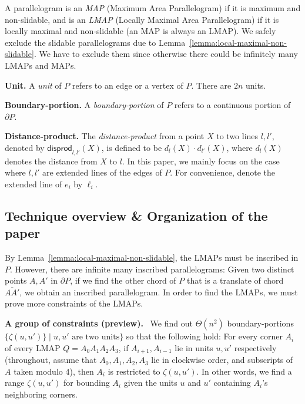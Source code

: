 \documentclass{ws-ijcga}
\begin{document}
\begin{definition}\label{def:LMAP}
A parallelogram is an \emph{MAP} (Maximum Area Parallelogram) if it is maximum and non-slidable,
and is an \emph{LMAP} (Locally Maximal Area Parallelogram) if it is locally maximal and non-slidable
(an MAP is always an LMAP).
We safely exclude the slidable parallelograms due to Lemma~\ref{lemma:local-maximal-non-slidable}.
We have to exclude them since otherwise there could be infinitely many LMAPs and MAPs.
\end{definition}

\noindent\textbf{Unit.} A \emph{unit} of $P$ refers to an edge or a vertex of $P$. There are $2n$ units.\smallskip

\noindent\textbf{Boundary-portion.} A \emph{boundary-portion} of $P$ refers to a continuous portion of $\partial P$.\smallskip

\newcommand{\dist}{\mathsf{disprod}}
\newcommand{\el}{\ell}        %
\noindent\textbf{Distance-product.} The \emph{distance-product} from a point $X$ to two lines $l,l'$,
  denoted by $\dist_{l,l'}(X)$, is defined to be $d_l(X)\cdot d_{l'}(X)$, where $d_l(X)$ denotes the distance from $X$ to $l$.
In this paper, we mainly focus on the case where $l,l'$ are extended lines of the edges of $P$.
For convenience, denote the extended line of $e_i$ by $\el_i$.

\subsection{Technique overview \& Organization of the paper}\label{subsect:techover}

By Lemma~\ref{lemma:local-maximal-non-slidable}, the LMAPs must be inscribed in $P$.
However, there are infinite many inscribed parallelograms:
  Given two distinct points $A,A'$ in $\partial P$, if we find the other chord of $P$ that is a translate of chord $\overline{AA'}$, we obtain an inscribed parallelogram. In order to find the LMAPs, we must prove more constraints of the LMAPs.

\smallskip \noindent \textbf{A group of constraints (preview).}\mbox{  }
  We find out $\Theta(n^2)$ boundary-portions $\{\zeta(u,u')\}\mid u,u'\text{ are two units}\}$ so that the following hold:
  For every corner $A_i$ of every LMAP $Q=A_0A_1A_2A_3$, if $A_{i+1},A_{i-1}$ lie in units $u,u'$ respectively
    (throughout, assume that $A_0,A_1,A_2,A_3$ lie in clockwise order, and subscripts of $A$ taken modulo 4), then $A_i$ is restricted to $\zeta(u,u')$.
    In other words, we find a range $\zeta(u,u')$ for bounding $A_i$ given the units $u$ and $u'$ containing $A_i$'s neighboring corners.
\end{document}
